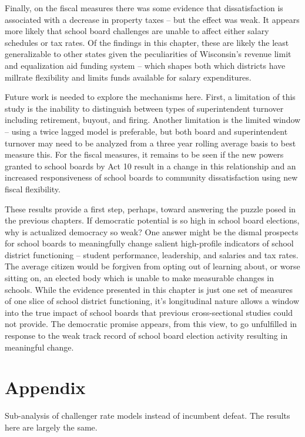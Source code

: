 Finally, on the fiscal measures there was some evidence that dissatisfaction is 
associated with a decrease in property taxes -- but the effect was weak. It 
appears more likely that school board challenges are unable to affect either 
salary schedules or tax rates. Of the findings in this chapter, these are 
likely the least generalizable to other states given the peculiarities of 
Wisconsin's revenue limit and equalization aid funding system -- which shapes 
both which districts have millrate flexibility and limits funds available for 
salary expenditures. 

Future work is needed to explore the mechanisms here. First, a limitation of 
this study is the inability to distinguish between types of superintendent 
turnover including retirement, buyout, and firing. Another limitation is the 
limited window -- using a twice lagged model is preferable, but both board 
and superintendent turnover may need to be analyzed from a three year rolling 
average basis to best measure this. For the fiscal measures, it remains to be 
seen if the new powers granted to school boards by Act 10 result in a change 
in this relationship and an increased responsiveness of school boards to 
community dissatisfaction using new fiscal flexibility. 

These results provide a first step, perhaps, toward answering the puzzle posed 
in the previous chapters. If democratic potential is so high in school board 
elections, why is actualized democracy so weak? One answer might be the dismal 
prospects for school boards to meaningfully change salient high-profile indicators 
of school district functioning -- student performance, leadership, and salaries 
and tax rates. The average citizen would be forgiven from opting out of learning 
about, or worse sitting on, an elected body which is unable to make measurable 
changes in schools. While the evidence presented in this chapter is just one 
set of measures of one slice of school district functioning, it's longitudinal 
nature allows a window into the true impact of school boards that previous 
cross-sectional studies could not provide. The democratic promise appears, from 
this view, to go unfulfilled in response to the weak track record of school board 
election activity resulting in meaningful change. 


\section{Appendix}

Sub-analysis of challenger rate models instead of incumbent defeat. The results 
here are largely the same.

